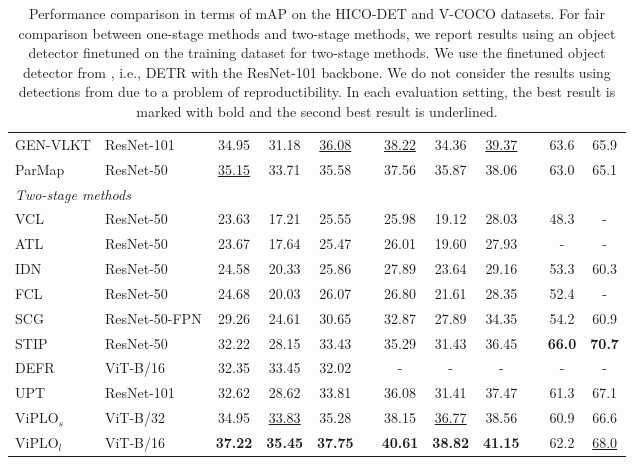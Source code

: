 \documentclass[10pt,twocolumn,letterpaper]{article}
\begin{document}
\begin{table*}[t]
\begin{center}
{\begin{tabular}{llcccccccccc}
GEN-VLKT \cite{liao2022gen} & ResNet-101 & 34.95 & 31.18 & \underline{36.08} && \underline{38.22} & 34.36 & \underline{39.37} && 63.6 & 65.9 \\
ParMap \cite{wu2022mining} & ResNet-50 & \underline{35.15} & 33.71 & 35.58 && 37.56 & 35.87 & 38.06 && 63.0 & 65.1\\
\hline
\multicolumn{5}{l}{\emph{Two-stage methods}} \\
VCL \cite{hou2020visual}    & ResNet-50 & 23.63 & 17.21 & 25.55 && 25.98 & 19.12 & 28.03 && 48.3 & -\\
ATL \cite{hou2021affordance}  & ResNet-50 & 23.67 & 17.64 & 25.47 && 26.01 & 19.60 & 27.93 && - & -\\
IDN \cite{li2020hoi}  & ResNet-50 & 24.58 & 20.33 & 25.86 && 27.89 & 23.64 & 29.16 && 53.3 & 60.3\\
FCL \cite{hou2021detecting} & ResNet-50 & 24.68 & 20.03 & 26.07 && 26.80 & 21.61 & 28.35 && 52.4 & - \\
SCG \cite{zhang2021spatially} & ResNet-50-FPN & 29.26 & 24.61 & 30.65 && 32.87 & 27.89 & 34.35 && 54.2 & 60.9 \\
STIP \cite{zhang2022exploring} & ResNet-50 & 32.22 & 28.15 & 33.43 && 35.29 & 31.43 & 36.45 && \textbf{66.0} & \textbf{70.7} \\
DEFR \cite{jin2022overlooked} & ViT-B/16 & 32.35 & 33.45 & 32.02 && - & - & - && - & - \\
UPT \cite{zhang2022efficient} & ResNet-101 & 32.62 & 28.62 & 33.81 && 36.08 & 31.41 & 37.47 && 61.3 & 67.1 \\
\rowcolor{Gray}
$\textrm{ViPLO}_{s}$ & ViT-B/32 & 34.95 & \underline{33.83} & 35.28 && 38.15 & \underline{36.77} & 38.56 && 60.9 & 66.6 \\
\rowcolor{Gray}
$\textrm{ViPLO}_{l}$ & ViT-B/16 & \textbf{37.22} & \textbf{35.45} & \textbf{37.75} && \textbf{40.61} & \textbf{38.82} & \textbf{41.15} && 62.2 & \underline{68.0} \\
\hline
\end{tabular}}
\end{center}
\vspace{-0.2in}
\caption{Performance comparison in terms of mAP on the HICO-DET and V-COCO datasets. For fair comparison between one-stage methods and two-stage methods, we report results using an object detector finetuned on the training dataset for two-stage methods. We use the finetuned object detector from \cite{zhang2022efficient}, i.e., DETR with the ResNet-101 backbone. We do not consider the results using detections from \cite{gao2020drg} due to a problem of reproductibility. In each evaluation setting, the best result is marked with bold and the second best result is underlined.} 
\label{tab:compare-all}
\end{table*}
\end{document}
